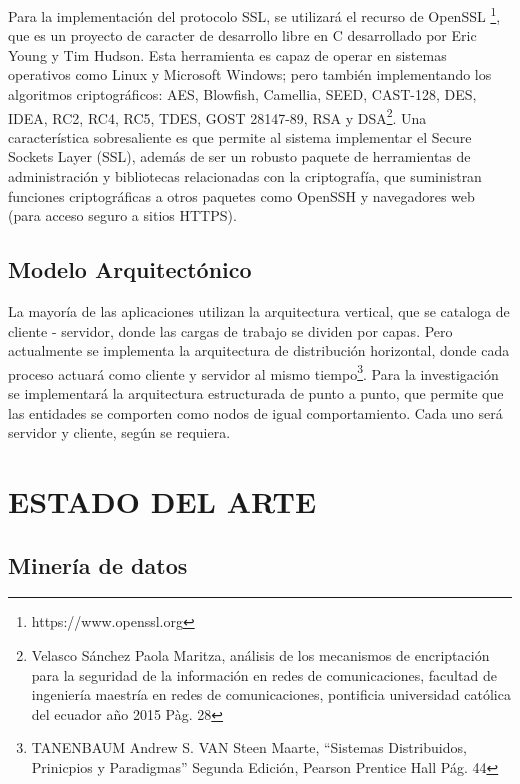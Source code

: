 \documentclass[a4paper,openright,12pt]{book}
\theoremstyle{definition}
\theoremstyle{remark}
\begin{document}
Para la implementación del protocolo SSL, se utilizará el recurso de OpenSSL \footnote{https://www.openssl.org}, que es un proyecto de caracter de desarrollo libre en C desarrollado por Eric Young y Tim Hudson. Esta herramienta es capaz de operar en sistemas operativos como Linux y
Microsoft Windows; pero también implementando los algoritmos criptográficos: AES, Blowfish, Camellia, SEED, CAST-128, DES, IDEA, RC2, RC4, RC5, TDES, GOST 28147-89, RSA y DSA\footnote{
Velasco Sánchez Paola Maritza, análisis de los mecanismos de encriptación para la seguridad de la información en redes de comunicaciones, facultad de ingeniería maestría en redes de comunicaciones, pontificia universidad católica del ecuador año 2015 Pàg. 28}. Una característica sobresaliente es que permite al sistema implementar el Secure Sockets Layer (SSL), además de ser un robusto paquete de herramientas de administración y bibliotecas relacionadas con la criptografía, que suministran funciones criptográficas a otros paquetes como OpenSSH y navegadores web (para acceso seguro a sitios HTTPS).
    \subsection{Modelo Arquitectónico}
La mayoría de las aplicaciones utilizan la arquitectura vertical, que se cataloga de cliente - servidor, donde las cargas de trabajo se dividen por capas. Pero actualmente se implementa la arquitectura de distribución horizontal, donde cada proceso actuará como cliente y servidor al mismo tiempo\footnote{TANENBAUM Andrew S. VAN Steen Maarte,  “Sistemas Distribuidos, Prinicpios y Paradigmas” Segunda Edición, Pearson Prentice Hall Pág. 44}. Para la investigación se implementará la arquitectura estructurada de punto a punto, que permite que las entidades se comporten como nodos de igual comportamiento. Cada uno será servidor y cliente, según se requiera.
\section{ESTADO DEL ARTE}
	\subsection{Minería de datos }
    
\end{document}
